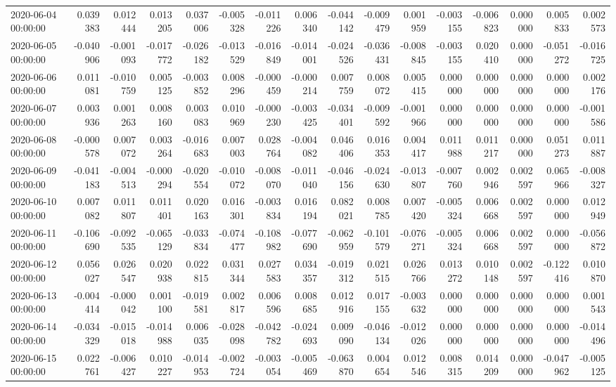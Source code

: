 \begin{tabular}{lrrrrrrrrrrrrrrr}
2020-06-04 00:00:00 & 0.039383 & 0.012444 & 0.013205 & 0.037006 & -0.005328 & -0.011226 & 0.006340 & -0.044142 & -0.009479 & 0.001959 & -0.003155 & -0.006823 & 0.000000 & 0.005833 & 0.002573 \\
2020-06-05 00:00:00 & -0.040906 & -0.001093 & -0.017772 & -0.026182 & -0.013529 & -0.016849 & -0.014001 & -0.024526 & -0.036431 & -0.008845 & -0.003155 & 0.020410 & 0.000000 & -0.051272 & -0.016725 \\
2020-06-06 00:00:00 & 0.011081 & -0.010759 & 0.005125 & -0.003852 & 0.008296 & -0.000459 & -0.000214 & 0.007759 & 0.008072 & 0.005415 & 0.000000 & 0.000000 & 0.000000 & 0.000000 & 0.002176 \\
2020-06-07 00:00:00 & 0.003936 & 0.001263 & 0.008160 & 0.003083 & 0.010969 & -0.000230 & -0.003425 & -0.034401 & -0.009592 & -0.001966 & 0.000000 & 0.000000 & 0.000000 & 0.000000 & -0.001586 \\
2020-06-08 00:00:00 & -0.000578 & 0.007072 & 0.003264 & -0.016683 & 0.007003 & 0.028764 & -0.004082 & 0.046406 & 0.016353 & 0.004417 & 0.011988 & 0.011217 & 0.000000 & 0.051273 & 0.011887 \\
2020-06-09 00:00:00 & -0.041183 & -0.004513 & -0.000294 & -0.020554 & -0.010072 & -0.008070 & -0.011040 & -0.046156 & -0.024630 & -0.013807 & -0.007760 & 0.002946 & 0.002597 & 0.065966 & -0.008327 \\
2020-06-10 00:00:00 & 0.007082 & 0.011807 & 0.011401 & 0.020163 & 0.016301 & -0.003834 & 0.016194 & 0.082021 & 0.008785 & 0.007420 & -0.005324 & 0.006668 & 0.002597 & 0.000000 & 0.012949 \\
2020-06-11 00:00:00 & -0.106690 & -0.092535 & -0.065129 & -0.033834 & -0.074477 & -0.108982 & -0.077690 & -0.062959 & -0.101579 & -0.076271 & -0.005324 & 0.006668 & 0.002597 & 0.000000 & -0.056872 \\
2020-06-12 00:00:00 & 0.056027 & 0.026547 & 0.020938 & 0.022815 & 0.031344 & 0.027583 & 0.034357 & -0.019312 & 0.021515 & 0.026766 & 0.013272 & 0.010148 & 0.002597 & -0.122416 & 0.010870 \\
2020-06-13 00:00:00 & -0.004414 & -0.000042 & 0.001100 & -0.019581 & 0.002817 & 0.006596 & 0.008685 & 0.012916 & 0.017155 & -0.003632 & 0.000000 & 0.000000 & 0.000000 & 0.000000 & 0.001543 \\
2020-06-14 00:00:00 & -0.034329 & -0.015018 & -0.014988 & 0.006035 & -0.028098 & -0.042782 & -0.024693 & 0.009090 & -0.046134 & -0.012026 & 0.000000 & 0.000000 & 0.000000 & 0.000000 & -0.014496 \\
2020-06-15 00:00:00 & 0.022761 & -0.006427 & 0.010227 & -0.014953 & -0.002724 & -0.003054 & -0.005469 & -0.063870 & 0.004654 & 0.012546 & 0.008315 & 0.014209 & 0.000000 & -0.047962 & -0.005125 \\

\end{tabular}
